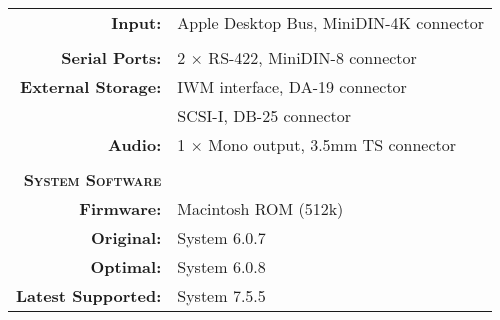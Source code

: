\begin{tabular}{ r p{6in} }
\textbf{Input:} & Apple Desktop Bus, MiniDIN-4K connector \\
\\
\textbf{Serial Ports:} & 2 \(\times\) RS-422, MiniDIN-8 connector \\
\textbf{External Storage:} & IWM interface, DA-19 connector \\
~ & SCSI-I, DB-25 connector \\
\textbf{Audio:} & 1 \(\times\) Mono output, 3.5mm TS connector \\
\\
\textbf{\textsc{System Software}} & ~ \\
\textbf{Firmware:} & Macintosh ROM (512k) \\
\textbf{Original:} & System 6.0.7 \\
\textbf{Optimal:} & System 6.0.8 \\
\textbf{Latest Supported:} & System 7.5.5 \\
\end{tabular}